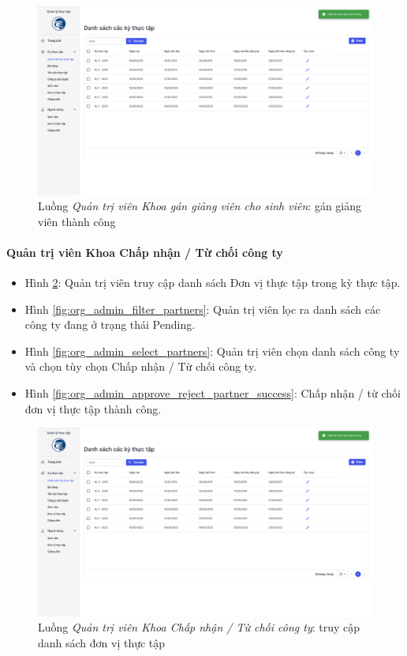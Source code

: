 \documentclass[./../main.tex]{subfiles}
\begin{document}
\begin{figure}[]
	\includegraphics[width=\linewidth]{./images/image55.png} %
	\caption{Luồng \emph{Quản trị viên Khoa gán giảng viên cho sinh viên}: gán giảng viên thành công}
	\label{fig:org_admin_assign_success}
\end{figure}

\paragraph*{Quản trị viên Khoa Chấp nhận / Từ chối công ty}

\begin{itemize}
	\item Hình \ref{fig:org_admin_access_list_intern_partners}: Quản trị viên truy cập danh sách Đơn vị thực tập trong kỳ thực tập. 
	\item Hình \ref{fig:org_admin_filter_partners}: Quản trị viên lọc ra danh sách các công ty đang ở trạng thái Pending.
	\item Hình \ref{fig:org_admin_select_partners}: Quản trị viên chọn danh sách công ty và chọn tùy chọn Chấp nhận / Từ chối công ty.
	\item Hình \ref{fig:org_admin_approve_reject_partner_success}: Chấp nhận / từ chối đơn vị thực tập thành công.
\end{itemize}

\begin{figure}[]
	\includegraphics[width=\linewidth]{./images/image55.png} %
	\caption{Luồng \emph{Quản trị viên Khoa Chấp nhận / Từ chối công ty}: truy cập danh sách đơn vị thực tập}
	\label{fig:org_admin_access_list_intern_partners}
\end{figure}
\end{document}
